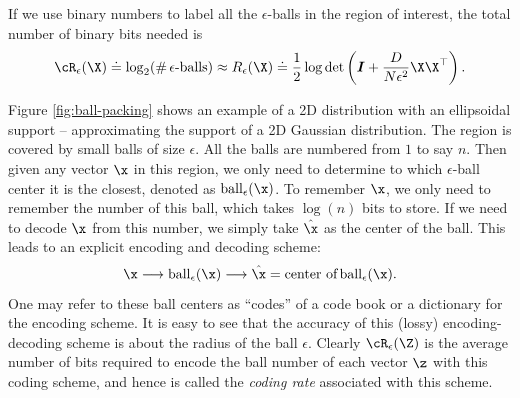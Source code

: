 \documentclass[../../book-main.tex]{subfiles}
\begin{document}
If we use binary numbers to label all the $\epsilon$-balls in the region of interest, the total number of binary bits needed is %
\begin{equation} 
	\cR_{\epsilon}(\X) \doteq \log_2 (\# \,\epsilon\mbox{-balls}) \approx R_{\epsilon}(\X) \doteq \frac{1}{2} \log \det \left(\boldsymbol{I} + \frac{D}{N\epsilon^2} \X\X^\top \right).
	\label{eqn:rate-Gaussian}
\end{equation}

\begin{example}
	Figure \ref{fig:ball-packing} shows an example of a 2D distribution with an ellipsoidal support -- approximating the support of a 2D Gaussian distribution. The region is covered by small balls of size $\epsilon$. All the balls are numbered from $1$ to say $n$. Then given any vector $\x$ in this region, we
	only need to determine to which $\epsilon$-ball center it is the closest, denoted as $\operatorname{ball}_{\epsilon}(\x)$. To remember $\x$, we only need to remember the number of this ball, which takes $\log(n)$ bits to store. If we need to decode $\x$ from this number, we simply take $\hat \x$ as the center of the ball. This leads to an explicit encoding and decoding scheme:
	\begin{equation}
		\x \longrightarrow \operatorname{ball}_{\epsilon}(\x) \longrightarrow \hat \x = \mbox{center of} \operatorname{ball}_{\epsilon}(\x).
	\end{equation}
	One may refer to these ball centers as  ``codes'' of a code book or a dictionary for the encoding scheme. It is easy to see that the accuracy of this (lossy) encoding-decoding scheme is about the radius of the ball $\epsilon$. Clearly $\cR_{\epsilon}(\Z)$ is the average number of bits required to encode the ball number of each vector $\z$ with this coding scheme, and hence is called the {\em coding rate} associated with this scheme.
\end{example}
\end{document}
